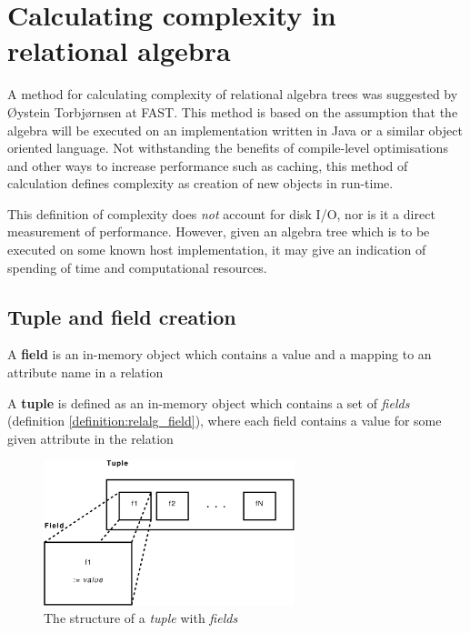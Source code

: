 \section{Calculating complexity in relational algebra}
\label{sect:method:complexity}
A method for calculating complexity of relational algebra trees was suggested
by \O ystein Torbj\o rnsen at FAST. This method is based on the assumption
that the algebra will be executed on an implementation written in Java or a
similar object oriented language. Not withstanding the
benefits of compile-level optimisations and other ways to increase performance
such as caching, this method of calculation defines complexity as creation of
new objects in run-time.

This definition of complexity does \textit{not} account
for disk I/O, nor is it a direct measurement of performance. However, given
an algebra tree which is to be executed on some known host implementation, it
may give an indication of spending of time and computational resources.

\subsection{Tuple and field creation}

\begin{myDefinition}
A \textbf{field} is an in-memory object which contains a value and a mapping to
an attribute name in a relation
\label{definition:relalg_field}
\end{myDefinition}

\begin{myDefinition}
A \textbf{tuple} is defined as an in-memory object which contains a set of
\textit{fields} (definition \ref{definition:relalg_field}), where each field
contains a value for some given attribute in the relation
\label{definition:relalg_tuple}
\end{myDefinition}

\begin{figure}[htp]
\begin{center}
  \includegraphics[width=0.65\textwidth]{diagrams/tuple_post}
  \caption[Tuple/Field structure]{The structure of a \textit{tuple} with
  \textit{fields}}
  \label{fig:method:tuple_field}
\end{center}
\end{figure}

